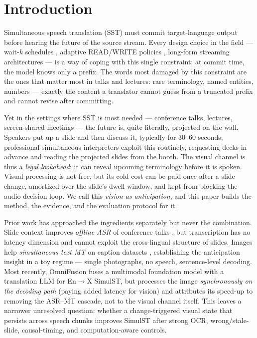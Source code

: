 \section{Introduction}
\label{sec:intro}

Simultaneous speech translation (SST) must commit target-language output before
hearing the future of the source stream. Every design choice in the field ---
wait-$k$ schedules \citep{ma2019stacl}, adaptive READ/WRITE policies
\citep{liu2020lowlatency,papi2023alignatt}, long-form streaming architectures
\citep{ouyang2025infinisst} --- is a way of coping with this single constraint:
at commit time, the model knows only a prefix. The words most damaged by this
constraint are the ones that matter most in talks and lectures: rare
terminology, named entities, numbers --- exactly the content a translator cannot
guess from a truncated prefix and cannot revise after committing.

Yet in the settings where SST is most needed --- conference talks, lectures,
screen-shared meetings --- the future is, quite literally, projected on the
wall. Speakers put up a slide and then discuss it, typically for 30--60 seconds;
professional simultaneous interpreters exploit this routinely, requesting decks
in advance and reading the projected slides from the booth. The visual channel
is thus a \emph{legal lookahead}: it can reveal upcoming terminology before it
is spoken. Visual processing is not free, but its cold cost can be paid once
after a slide change, amortized over the slide's dwell window, and kept from
blocking the audio decision loop. We call this \emph{vision-as-anticipation},
and this paper builds the method, the evidence, and the evaluation protocol for
it.

Prior work has approached the ingredients separately but never the combination.
Slide context improves \emph{offline ASR} of conference talks
\citep{sinhamahapatra2025slides}, but transcription has no latency dimension and
cannot exploit the cross-lingual structure of slides. Images help
\emph{simultaneous text MT} on caption datasets \citep{caglayan2020simultaneous,
ive2021exploiting}, establishing the anticipation insight in a toy regime ---
single photographs, no speech, sentence-level decoding. Most recently,
OmniFusion \citep{koneru2025omnifusion} fuses a multimodal foundation model with
a translation LLM for En$\rightarrow$X SimulST, but processes the image
\emph{synchronously on the decoding path} (paying added latency for vision) and
attributes its speed-up to removing the ASR--MT cascade, not to the visual
channel itself. This leaves a narrower unresolved question: whether a
change-triggered visual state that persists across speech chunks improves
SimulST after strong OCR, wrong/stale-slide, causal-timing, and
computation-aware controls.

